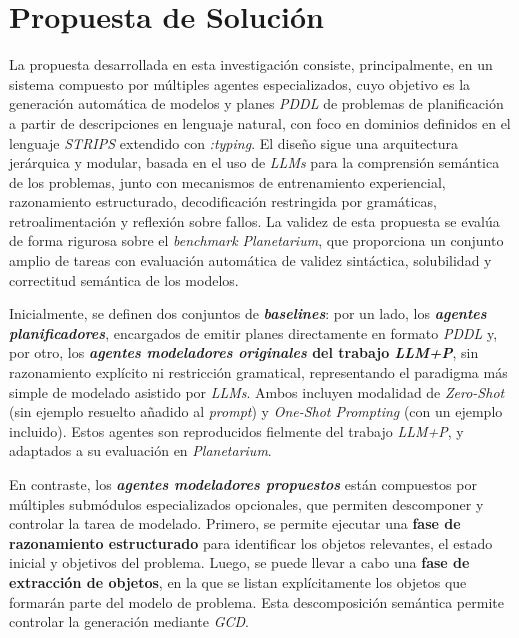 \chapter{Propuesta de Solución}\label{chapter:proposal}

La propuesta desarrollada en esta investigación consiste, principalmente, en un sistema compuesto por múltiples agentes especializados, cuyo objetivo es la generación automática de modelos y planes \textit{PDDL} de problemas de planificación a partir de descripciones en lenguaje natural, con foco en dominios definidos en el lenguaje \textit{STRIPS} extendido con \textit{:typing}. El diseño sigue una arquitectura jerárquica y modular, basada en el uso de \textit{LLMs} para la comprensión semántica de los problemas, junto con mecanismos de entrenamiento experiencial, razonamiento estructurado, decodificación restringida por gramáticas, retroalimentación y reflexión sobre fallos. La validez de esta propuesta se evalúa de forma rigurosa sobre el \textit{benchmark Planetarium}, que proporciona un conjunto amplio de tareas con evaluación automática de validez sintáctica, solubilidad y correctitud semántica de los modelos.

Inicialmente, se definen dos conjuntos de \textbf{\textit{baselines}}: por un lado, los \textbf{\textit{agentes planificadores}}, encargados de emitir planes directamente en formato \textit{PDDL} y, por otro, los \textbf{\textit{agentes modeladores originales} del trabajo \textit{LLM+P}}, sin razonamiento explícito ni restricción gramatical, representando el paradigma más simple de modelado asistido por \textit{LLMs}. Ambos incluyen modalidad de \textit{Zero-Shot} (sin ejemplo resuelto añadido al \textit{prompt}) y \textit{One-Shot Prompting} (con un ejemplo incluido). Estos agentes son reproducidos fielmente del trabajo \textit{LLM+P}, y adaptados a su evaluación en \textit{Planetarium}.

En contraste, los \textbf{\textit{agentes modeladores propuestos}} están compuestos por múltiples submódulos especializados opcionales, que permiten descomponer y controlar la tarea de modelado. Primero, se permite ejecutar una \textbf{fase de razonamiento estructurado} para identificar los objetos relevantes, el estado inicial y objetivos del problema. Luego, se puede llevar a cabo una \textbf{fase de extracción de objetos}, en la que se listan explícitamente los objetos que formarán parte del modelo de problema. Esta descomposición semántica permite controlar la generación mediante \textit{GCD}.

